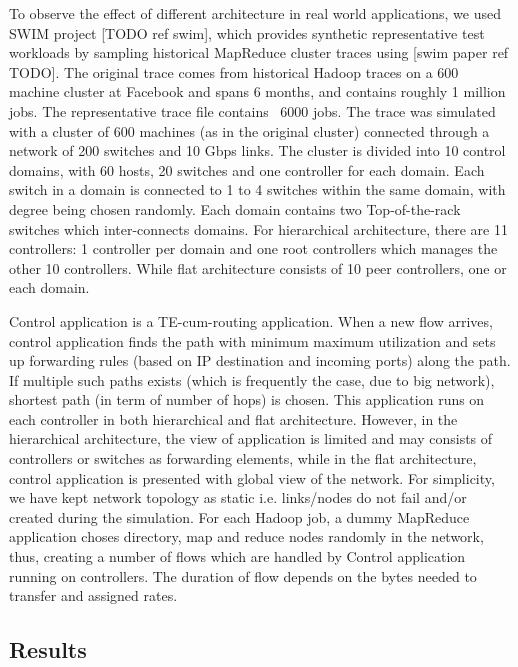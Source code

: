 \documentclass[10pt, twocolumn]{article}
\begin{document}
To observe the effect of different architecture in real world applications, we used SWIM project [TODO ref swim], which provides synthetic representative test workloads  by sampling historical MapReduce cluster traces using [swim paper ref TODO]. The original trace comes from historical Hadoop traces on a 600 machine cluster at Facebook and spans 6 months, and contains roughly 1 million jobs. The representative trace file contains ~6000 jobs. The trace was simulated with a cluster of 600 machines (as in the original cluster) connected through a network of 200 switches and 10 Gbps links. The cluster is divided into 10 control domains, with 60 hosts, 20 switches and one controller for each domain. Each switch in a domain is connected to 1 to 4 switches within the same domain, with degree being chosen randomly. Each domain contains two Top-of-the-rack switches which inter-connects domains. For hierarchical architecture, there are 11 controllers: 1 controller per domain and one root controllers which manages the other 10 controllers. While flat architecture consists of 10 peer controllers, one or each domain.

Control application is a TE-cum-routing application. When a new flow arrives, control application finds the path with minimum maximum utilization and sets up forwarding rules (based on IP destination and incoming ports) along the path. If multiple such paths exists (which is frequently the case, due to big network), shortest path (in term of number of hops) is chosen. This application runs on each controller in both hierarchical and flat architecture. However, in the hierarchical architecture, the view of application is limited and may consists of controllers or switches as forwarding elements, while in the flat architecture, control application is presented with global view of the network. For simplicity, we have kept network topology as static i.e. links/nodes do not fail and/or created during the simulation. For each Hadoop job, a dummy MapReduce application choses directory, map and reduce nodes randomly in the network, thus, creating a number of flows which are handled by Control application running on controllers. The duration of flow depends on the bytes needed to transfer and assigned rates.            

\subsection{Results}
\label{subsec:results}
\end{document}
